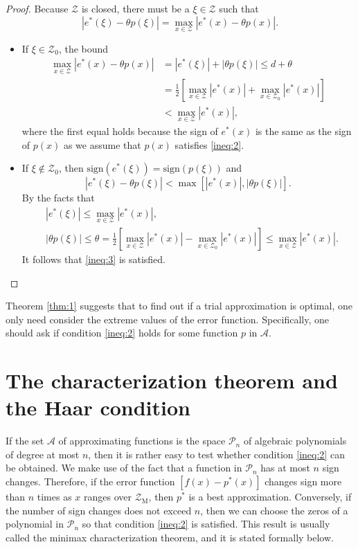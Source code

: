 \documentclass[11pt]{article}
\begin{document}
\begin{proof}
Because $\mathscr{Z}$ is closed, there must be a $\xi \in \mathscr{Z}$ such that 
\[
|e^*(\xi) - \theta p(\xi)| = \max_{x\in\mathscr{Z}} |e^*(x)-\theta p(x)|.
\]
\begin{itemize}
\item If $\xi\in\mathscr{Z}_0$, the bound
\[
\begin{aligned}
\max_{x\in\mathscr{Z}} |e^*(x) - \theta p(x)| & = |e^*(\xi)| + |\theta p(\xi)| \leqslant d + \theta \\
& = \frac{1}{2} \left[ \max_{x\in\mathscr{Z}} |e^*(x)| + \max_{x\in\mathscr{Z}_0} |e^*(x)|\right ] \\
& < \max_{x\in\mathscr{Z}} |e^*(x)|,
\end{aligned}
\]
where the first equal holds because the sign of $e^*(x)$ is the same as the sign of $p(x)$ as we assume that $p(x)$ satisfies \eqref{ineq:2}.

\item If $\xi \notin \mathscr{Z}_0$, then $\mathrm{sign}(e^*(\xi)) = \mathrm{sign}(p(\xi))$ and
\[
|e^*(\xi) - \theta p(\xi)| < \max \left[ |e^*(x)|, |\theta p(\xi)|\right].
\]
By the facts that 
\[
\begin{aligned}
& |e^*(\xi)|   \leqslant \max_{x\in\mathscr{Z}} |e^*(x)|, \\
& |\theta p(\xi) |  \leqslant \theta = \frac{1}{2} \left[ \max_{x\in\mathscr{Z}} |e^*(x)| - \max_{x\in\mathscr{Z}_0} |e^*(x)|\right ] \leqslant \max_{x\in\mathscr{Z}} |e^*(x)|.
\end{aligned}
\]
It follows that \eqref{ineq:3} is satisfied.
\end{itemize}
\end{proof}

Theorem \ref{thm:1} suggests that to find out if a trial approximation is optimal, one only need consider the extreme values of the error function. Specifically, one should ask if condition \eqref{ineq:2} holds for some function $p$ in $\mathscr{A}$.

\section{The characterization theorem and the Haar condition} \label{sec:3}
If the set $\mathscr{A}$ of approximating functions is the space $\mathscr{P}_{n}$ of algebraic polynomials of degree at most $n$, then it is rather easy to test whether condition \eqref{ineq:2} can be obtained. We make use of the fact that a function in $\mathscr{P}_{n}$ has at most $n$ sign changes. Therefore, if the error function $\left[f(x)-p^{*}(x)\right]$ changes sign more than $n$ times as $x$ ranges over $\mathscr{Z}_{\mathrm{M}}$, then $p^{*}$ is a best approximation. Conversely, if the number of sign changes does not exceed $n$, then we can choose the zeros of a polynomial in $\mathscr{P}_{n}$ so that condition \eqref{ineq:2} is satisfied. This result is usually called the minimax characterization theorem, and it is stated formally below.
\end{document}
